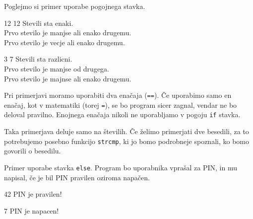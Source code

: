 \begin{examples}

Poglejmo si primer uporabe pogojnega stavka.


\begin{inout}
12 12
\tcblower
Stevili sta enaki.\\
Prvo stevilo je manjse ali enako drugemu.\\
Prvo stevilo je vecje ali enako drugemu.
\end{inout}

\begin{inout}
3 7
\tcblower
Stevili sta razlicni.\\
Prvo stevilo je manjse od drugega.\\
Prvo stevilo je majnse ali enako drugemu.
\end{inout}

\end{examples}


\begin{errors}
  Pri primerjavi moramo uporabiti dva enačaja (\verb+==+). Če uporabimo samo
  en enačaj, kot v matematiki (torej \verb+=+), se bo program sicer zagnal,
  vendar ne bo deloval pravilno.
  Enojnega enačaja nikoli ne uporabljamo v pogoju \verb+if+ stavka.
\end{errors}

\begin{errors}
  Taka primerjava deluje samo na številih. Če želimo primerjati dve besedili,
  za to potrebujemo posebno funkcijo \verb+strcmp+, ki jo bomo
  podrobneje spoznali, ko bomo govorili o besedilu.
\end{errors}

\begin{examples}

Primer uporabe stavka \verb+else+. Program bo uporabnika vprašal za PIN,
in mu napisal, če je bil PIN pravilen oziroma napačen.


\begin{inout}
42
\tcblower
PIN je pravilen!
\end{inout}

\begin{inout}
7
\tcblower
PIN je napacen!
\end{inout}

\end{examples}

